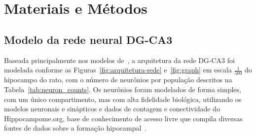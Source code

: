 \chapter{Materiais e Métodos}

\section{Modelo da rede neural DG-CA3}

Baseada principalmente nos modelos de~, a arquitetura
da rede DG-CA3 foi modelada conforme as Figuras~\ref{fig:arquitetura-rede} e~\ref{fig:graph} em escala $\frac{1}{500}$ do
hipocampo do rato, com o número de neurônios por população descritos na Tabela~\ref{tab:neuron_counts}. Os neurônios foram
modelados de forma simples, com um único compartimento, mas com alta fidelidade biológica, utilizando os modelos neuronais e
sinápticos e dados de contagem e conectividade do Hippocampome.org, base de conhecimento de acesso livre que compila diversas
fontes de dados sobre a formação hipocampal~\cite{wheelerHippocampomeorg2023}.

